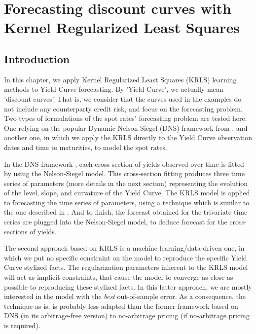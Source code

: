 %
\chapter{Forecasting discount curves with Kernel Regularized Least Squares}
\label{sec:discount_curve_krls}


\section{Introduction}

In this chapter, we apply Kernel Regularized Least Squares (KRLS) learning methods to Yield Curve forecasting. By 'Yield Curve', we actually mean 'discount curves'. That is, we consider that the curves used in the examples do not include any counterparty credit risk, and focus on the forecasting problem. Two types of formulations of the spot rates' forecasting problem are tested here. One relying on the popular Dynamic Nelson-Siegel (DNS) framework from \cite{diebold2006forecasting}, and another one, in which we apply the KRLS directly to the Yield Curve observation dates and time to maturities, to model the spot rates.

\medskip

In the DNS framework \cite{diebold2006forecasting}, each cross-section of yields observed over time is fitted by using the Nelson-Siegel \cite{nelson1987parsimonious} model. This cross-section fitting produces three time series of parameters (more details in the next section) representing the evolution of the level, slope, and curvature of the Yield Curve. The KRLS model  is applied to forecasting  the time series of parameters, using a technique which is similar to the one described in \cite{exterkate2016nonlinear}. And to finish, the forecast obtained for the trivariate time series are plugged into the Nelson-Siegel model, to deduce forecast for the cross-sections of yields.

\medskip

The second approach based on KRLS is a machine learning/data-driven one, in which we put no  specific constraint on the model to reproduce the specific Yield Curve stylized facts. The regularization parameters inherent to the KRLS model will act as implicit constraints, that cause the model to converge as close as possible to reproducing these stylized facts. In this latter approach, we are mostly interested in the model with the {\it best} out-of-sample error. As a consequence, the technique as is, is probably less adapted than the former framework based on DNS (in its arbitrage-free version) to no-arbitrage pricing (if no-arbitrage pricing is required).

